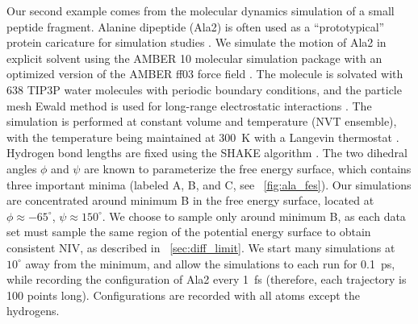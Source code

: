Our second example comes from the molecular dynamics simulation of a small peptide fragment.
%
Alanine dipeptide (Ala2) is often used as a ``prototypical'' protein caricature for simulation studies
\cite{apostolakis1999calculation, bolhuis2000reaction, chekmarev2004long, ma2005automatic, frewen2009exploration, ferguson2011integrating}.
%
We simulate the motion of Ala2 in explicit solvent using the AMBER 10 molecular simulation package \cite{case2008Amber} with an
optimized version \cite{best2009optimized} of the AMBER ff03 force field \cite{duan2003point}.
%
The molecule is solvated with 638 TIP3P water molecules \cite{jorgensen1983comparison}
with periodic boundary conditions, and the particle mesh Ewald method is used for long-range electrostatic interactions \cite{essmann1995smooth}.
%
The simulation is performed at constant volume and temperature (NVT ensemble), with the temperature being maintained at 300~K with a Langevin thermostat \cite{loncharich1992langevin}.
%
Hydrogen bond lengths are fixed using the SHAKE algorithm \cite{ryckaert1977numerical}.
%
The two dihedral angles $\phi$ and $\psi$ are known to parameterize the free energy surface, which contains three important minima (labeled A, B, and C, see \fig~\ref{fig:ala_fes}).
%
Our simulations are concentrated around minimum B in the free energy surface, located at $\phi \approx -65^{\circ}$, $\psi \approx 150^{\circ}$.
%
We choose to sample only around minimum B, as each data set must sample the same region of the potential energy surface to obtain consistent NIV, as described in \sec~\ref{sec:diff_limit}.
%
We start many simulations at $10^{\circ}$ away from the minimum, and allow the simulations to each run for 0.1~ps, while recording the configuration of Ala2 every 1~fs (therefore, each trajectory is 100 points long).
%
Configurations are recorded with all atoms except the hydrogens.

